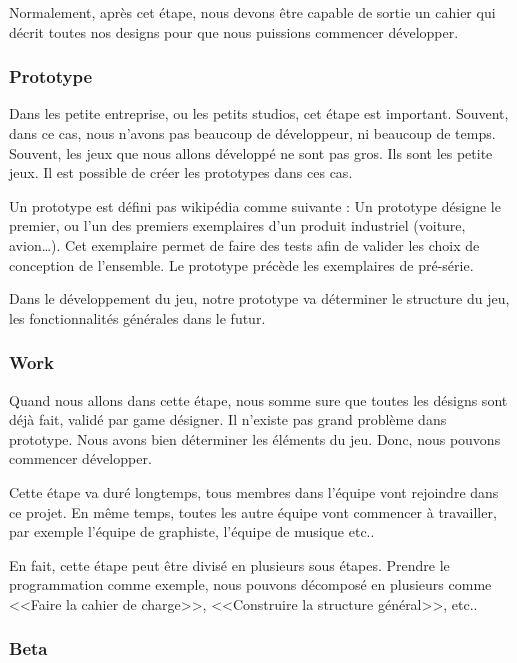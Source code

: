 Normalement, après cet étape, nous devons être capable de sortie un cahier qui décrit toutes nos designs pour que nous puissions commencer développer.


\subsubsection{Prototype} %

Dans les petite entreprise, ou les petits studios, cet étape est important. Souvent, dans ce cas, nous n'avons pas beaucoup de développeur, ni beaucoup de temps. Souvent, les jeux que nous allons développé ne sont pas gros. Ils sont les petite jeux. Il est possible de créer les prototypes dans ces cas. 

Un prototype est défini pas wikipédia comme suivante : Un prototype désigne le premier, ou l'un des premiers exemplaires d'un produit industriel (voiture, avion…). Cet exemplaire permet de faire des tests afin de valider les choix de conception de l'ensemble. Le prototype précède les exemplaires de pré-série. 

Dans le développement du jeu, notre prototype va déterminer le structure du jeu, les fonctionnalités générales dans le futur. 


\subsubsection{Work} %

Quand nous allons dans cette étape, nous somme sure que toutes les désigns sont déjà fait, validé par game désigner. Il n'existe pas grand problème dans prototype. Nous avons bien déterminer les éléments du jeu. Donc, nous pouvons commencer développer. 

Cette étape va duré longtemps, tous membres dans l'équipe vont rejoindre dans ce projet. En même temps, toutes les autre équipe vont commencer à travailler, par exemple l'équipe de graphiste, l'équipe de musique etc.. 

En fait, cette étape peut être divisé en plusieurs sous étapes. Prendre le programmation comme exemple, nous pouvons décomposé en plusieurs comme <<Faire la cahier de charge>>, <<Construire la structure général>>, etc..


\subsubsection{Beta} %

